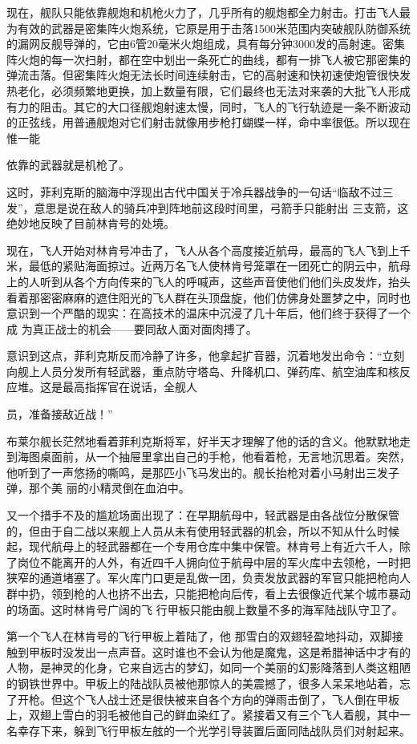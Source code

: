 \documentclass{article}
\begin{document}
现在，舰队只能依靠舰炮和机枪火力了，几乎所有的舰炮都全力射击。打击飞人最为有效的武器是密集阵火炮系统，它原是用于击落1500米范围内突破舰队防御系统的漏网反舰导弹的，它由6管20毫米火炮组成，具有每分钟3000发的高射速。密集阵火炮的每一次扫射，都在空中划出一条死亡的曲线，都有一排飞人被它那密集的弹流击落。但密集阵火炮无法长时间连续射击，它的高射速和快初速使炮管很快发热老化，必须频繁地更换，加上数量有限，它们最终也无法对来袭的大批飞人形成有力的阻击。其它的大口径舰炮射速太慢，同时，飞人的飞行轨迹是一条不断波动的正弦线，用普通舰炮对它们射击就像用步枪打蝴蝶一样，命中率很低。所以现在惟一能

\newpage
依靠的武器就是机枪了。 

这时，菲利克斯的脑海中浮现出古代中国关于冷兵器战争的一句话“临敌不过三发”，意思是说在敌人的骑兵冲到阵地前这段时间里，弓箭手只能射出
三支箭，这绝妙地反映了目前林肯号的处境。 

现在，飞人开始对林肯号冲击了，飞人从各个高度接近航母，最高的飞人飞到上千米，最低的紧贴海面掠过。近两万名飞人使林肯号笼罩在一团死亡的阴云中，航母上的人听到从各个方向传来的飞人的呼喊声，这些声音使他们他们头皮发炸，抬头看着那密密麻麻的遮住阳光的飞人群在头顶盘旋，他们仿佛身处噩梦之中，同时也意识到一个严酷的现实：在高技术的温床中沉浸了几十年后，他们终于获得了一个成
为真正战士的机会——要同敌人面对面肉搏了。 

意识到这点，菲利克斯反而冷静了许多，他拿起扩音器，沉着地发出命令：“立刻向舰上人员分发所有轻武器，重点防守塔岛、升降机口、弹药库、航空油库和核反应堆。这是最高指挥官在说话，全舰人

\newpage
员，准备接敌近战！” 

布莱尔舰长茫然地看着菲利克斯将军，好半天才理解了他的话的含义。他默默地走到海图桌面前，从一个抽屉里拿出自己的手枪，他看着枪，无言地沉思着。突然，他听到了一声悠扬的嘶鸣，是那匹小飞马发出的。舰长抬枪对着小马射出三发子弹，那个美
丽的小精灵倒在血泊中。 

又一个措手不及的尴尬场面出现了：在早期航母中，轻武器是由各战位分散保管的，但由于自二战以来舰上人员从未有使用轻武器的机会，所以不知从什么时候起，现代航母上的轻武器都在一个专用仓库中集中保管。林肯号上有近六千人，除了岗位不能离开的人外，有近四千人拥向位于航母中层的军火库中去领枪，一时把狭窄的通道堵塞了。军火库门口更是乱做一团，负责发放武器的军官只能把枪向人群中扔，领到枪的人也挤不出去，只能把枪向后传，看上去很像近代某个城市暴动的场面。这时林肯号广阔的飞
行甲板只能由舰上数量不多的海军陆战队守卫了。 

第一个飞人在林肯号的飞行甲板上着陆了，他
\newpage
那雪白的双翅轻盈地抖动，双脚接触到甲板时没发出一点声音。这时谁也不会认为他是魔鬼，这是希腊神话中才有的人物，是神灵的化身，它来自远古的梦幻，如同一个美丽的幻影降落到人类这粗陋的钢铁世界中。甲板上的陆战队员被他那惊人的美震撼了，很多人呆呆地站着，忘了开枪。但这个飞人战士还是很快被来自各个方向的弹雨击倒了，飞人倒在甲板上，双翅上雪白的羽毛被他自己的鲜血染红了。紧接着又有三个飞人着舰，其中一名幸存下来，躲到飞行甲板左舷的一个光学引导装置后面同陆战队员们对射起来。
\end{document}
